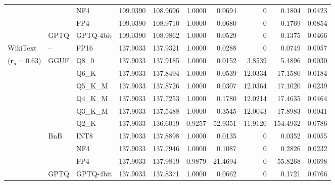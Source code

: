 \begin{table}[t]
{\begin{tabular}{ll l rrrrrrr}
 &  & NF4 & 109.0390 & 108.9696 & 1.0000 & 0.0694 & \cellcolor{cyan!12} $0$ & 0.1804 & 0.0423 \\
 &  & FP4 & 109.0390 & 108.9710 & 1.0000 & 0.0680 & \cellcolor{cyan!12} $0$ & 0.1769 & 0.0854 \\
 & GPTQ & GPTQ-4bit & 109.0390 & 108.9862 & 1.0000 & 0.0529 & \cellcolor{cyan!12} $0$ & 0.1375 & 0.0466 \\
\midrule
WikiText & -- & FP16 & 137.9033 & 137.9321 & 1.0000 & 0.0288 & \cellcolor{cyan!12} $0$ & 0.0749 & 0.0057 \\
{\small ($\mathbf{r_s{=}0.63}$)} & GGUF & Q8\_0 & 137.9033 & 137.9185 & 1.0000 & 0.0152 & 3.8539 & 5.4896 & 0.0030 \\
 &  & Q6\_K & 137.9033 & 137.8494 & 1.0000 & 0.0539 & 12.0334 & 17.1580 & 0.0184 \\
 &  & Q5\_K\_M & 137.9033 & 137.8726 & 1.0000 & 0.0307 & 12.0364 & 17.1020 & 0.0239 \\
 &  & Q4\_K\_M & 137.9033 & 137.7253 & 1.0000 & 0.1780 & 12.0214 & 17.4635 & 0.0464 \\
 &  & Q3\_K\_M & 137.9033 & 137.5488 & 1.0000 & 0.3545 & 12.0043 & 17.8983 & 0.0041 \\
 &  & Q2\_K & 137.9033 & 136.6019 & \cellcolor{red!18} 0.9257 & \cellcolor{red!18} 52.9351 & 11.9120 & \cellcolor{red!18} 154.4932 & \cellcolor{red!18} 0.0786 \\
 & BnB & INT8 & 137.9033 & 137.8898 & 1.0000 & 0.0135 & \cellcolor{cyan!12} $0$ & 0.0352 & 0.0055 \\
 &  & NF4 & 137.9033 & 137.7946 & 1.0000 & 0.1087 & \cellcolor{cyan!12} $0$ & 0.2826 & 0.0232 \\
 &  & FP4 & 137.9033 & 137.9819 & 0.9879 & 21.4694 & \cellcolor{cyan!12} $0$ & 55.8268 & 0.0698 \\
 & GPTQ & GPTQ-4bit & 137.9033 & 137.8371 & 1.0000 & 0.0662 & \cellcolor{cyan!12} $0$ & 0.1721 & 0.0766 \\
\bottomrule
\end{tabular}}
\end{table}
